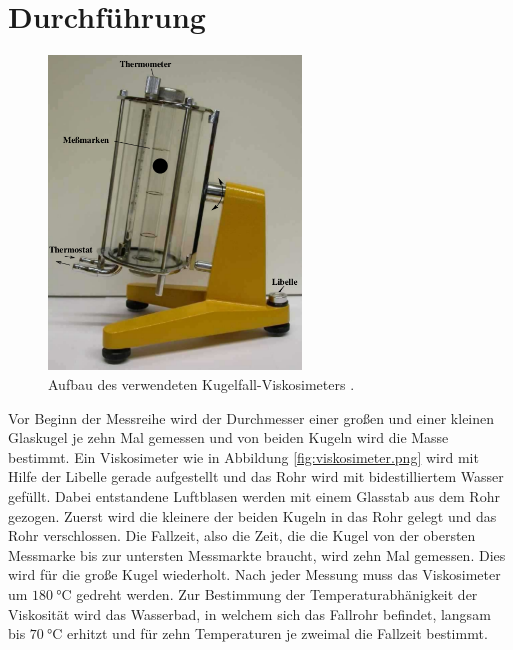 \section{Durchführung}
\label{sec:Durchführung}
\begin{figure}
  \centering
  \includegraphics[width=0.6\textwidth]{viskosimeter.png}
  \caption{Aufbau des verwendeten Kugelfall-Viskosimeters \cite{sample}.}
\end{figure}
Vor Beginn der Messreihe wird der Durchmesser einer großen und einer kleinen
Glaskugel je zehn Mal gemessen und von beiden Kugeln wird die Masse bestimmt.
Ein Viskosimeter wie in Abbildung \ref{fig:viskosimeter.png} wird mit Hilfe der
Libelle gerade aufgestellt und das Rohr wird mit bidestilliertem Wasser gefüllt.
Dabei entstandene Luftblasen werden mit einem Glasstab aus dem Rohr gezogen.
Zuerst wird die kleinere der beiden Kugeln in das Rohr gelegt und das Rohr
verschlossen. Die Fallzeit, also die Zeit, die die Kugel von der obersten Messmarke
bis zur untersten Messmarkte braucht, wird zehn Mal gemessen. Dies wird für die
große Kugel wiederholt. Nach jeder Messung muss das Viskosimeter um $\SI{180}
{\celsius}$ gedreht werden.\newline
Zur Bestimmung der Temperaturabhänigkeit der Viskosität wird das Wasserbad, in
welchem sich das Fallrohr befindet, langsam bis $\SI{70}{\celsius}$ erhitzt
und für zehn Temperaturen je zweimal die Fallzeit bestimmt.

